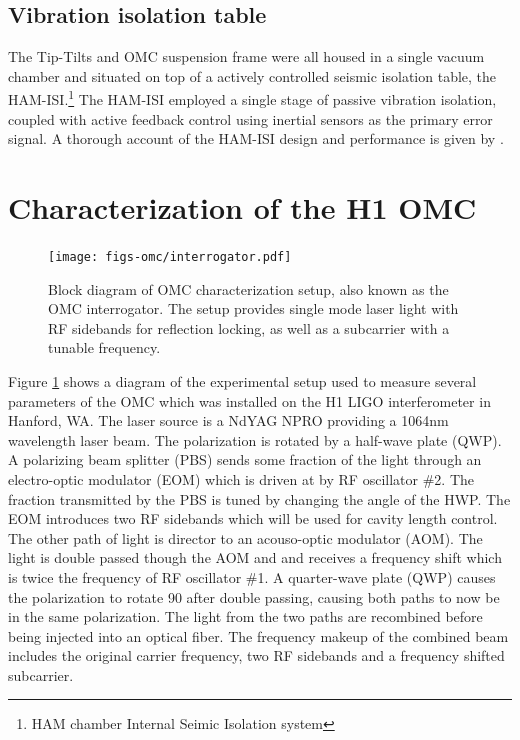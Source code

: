 \subsection{Vibration isolation table}
The Tip-Tilts and OMC suspension frame were all housed in a single vacuum chamber and situated on top of a actively controlled seismic isolation table, the HAM-ISI.\footnote{HAM chamber Internal Seimic Isolation system} The HAM-ISI employed a single stage of passive vibration isolation, coupled with active feedback control using inertial sensors as the primary error signal. %
A thorough account of the HAM-ISI design and performance is given by \citet{P1200020} .

\section{Characterization of the H1 OMC}
\begin{figure}
  \begin{center}
  \leavevmode
  \texttt{[image: figs-omc/interrogator.pdf]}
  \end{center}
  \caption[Block diagram of OMC characterization setup.]{Block diagram of OMC characterization setup, also known as the OMC interrogator. The setup provides single mode laser light with RF sidebands for reflection locking, as well as a subcarrier with a tunable frequency.}
  \label{fig:interrogator}
\end{figure}

Figure \ref{fig:interrogator} shows a diagram of the experimental setup used to measure several parameters of the OMC which was installed on the H1 LIGO interferometer in Hanford, WA. %
The laser source is a NdYAG NPRO providing a 1064nm wavelength laser beam. %
The polarization is rotated by a half-wave plate (QWP). %
A polarizing beam splitter (PBS) sends some fraction of the light through an electro-optic modulator (EOM) which is driven at by RF oscillator \#2. %
The fraction transmitted by the PBS is tuned by changing the angle of the HWP. %
The EOM introduces two RF sidebands which will be used for cavity length control. %
The other path of light is director to an acouso-optic modulator (AOM). %
The light is double passed though the AOM and and receives a frequency shift which is twice the frequency of RF oscillator \#1. %
A quarter-wave plate (QWP) causes the polarization to rotate 90\degrees{} after double passing, causing both paths to now be in the same polarization. %
The light from the two paths are recombined before being injected into an optical fiber. %
The frequency makeup of the combined beam includes the original carrier frequency, two RF sidebands and a frequency shifted subcarrier.

